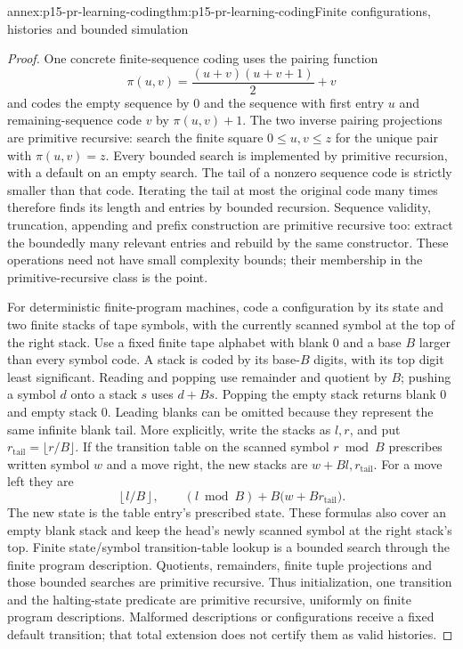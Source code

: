 
\begin{annexitem}{annex:p15-pr-learning-coding}{thm:p15-pr-learning-coding}{Finite configurations, histories and bounded simulation}
\begin{proof}
One concrete finite-sequence coding uses the pairing function
\[
 \pi(u,v)=\frac{(u+v)(u+v+1)}2+v
\]
and codes the empty sequence by \(0\) and the sequence with first
entry \(u\) and remaining-sequence code \(v\) by
\(\pi(u,v)+1\). The two inverse pairing projections are
primitive recursive: search the finite square
\(0\leq u,v\leq z\) for the unique pair with \(\pi(u,v)=z\).
Every bounded search is implemented by primitive recursion,
with a default on an empty search.
The tail of a nonzero sequence code is strictly smaller than
that code. Iterating the tail at most the original code many
times therefore finds its length and entries by bounded
recursion. Sequence validity, truncation, appending and
prefix construction are primitive recursive too: extract
the boundedly many relevant entries and rebuild by the
same constructor. These operations need not have small
complexity bounds; their membership in the primitive-recursive
class is the point.

For deterministic finite-program machines, code a configuration
by its state and two finite stacks of tape symbols, with the
currently scanned symbol at the top of the right stack.
Use a fixed finite tape alphabet with blank \(0\) and a base \(B\)
larger than every symbol code. A stack is coded by its base-\(B\)
digits, with its top digit least significant. Reading and
popping use remainder and quotient by \(B\); pushing a
symbol \(d\) onto a stack \(s\) uses \(d+Bs\).
Popping the empty stack returns blank \(0\) and empty stack \(0\).
Leading blanks can be omitted because they represent the same
infinite blank tail. More explicitly, write the stacks as
\(l,r\), and put \(r_{\mathrm{tail}}=\lfloor r/B\rfloor\).
If the transition table on the scanned symbol \(r\bmod B\)
prescribes written symbol \(w\) and a move right, the new
stacks are \(w+Bl,r_{\mathrm{tail}}\).
For a move left they are
\[
 \left\lfloor l/B\right\rfloor,\qquad
 (l\bmod B)+B\bigl(w+B r_{\mathrm{tail}}\bigr).
\]
The new state is the table entry's prescribed state.
These formulas also cover an empty blank stack and keep
the head's newly scanned symbol at the right stack's top.
Finite state/symbol transition-table lookup is a bounded
search through the finite program description.
Quotients, remainders, finite tuple projections and those
bounded searches are primitive recursive. Thus initialization,
one transition and the halting-state predicate are primitive
recursive, uniformly on finite program descriptions.
Malformed descriptions or configurations receive a fixed
default transition; that total extension does not certify
them as valid histories.


\end{proof}
\end{annexitem}
